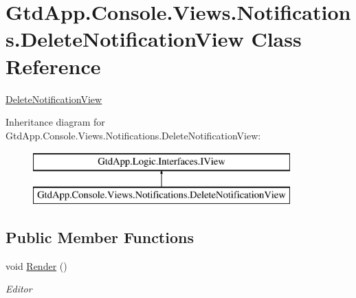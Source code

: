 \hypertarget{class_gtd_app_1_1_console_1_1_views_1_1_notifications_1_1_delete_notification_view}{}\section{Gtd\+App.\+Console.\+Views.\+Notifications.\+Delete\+Notification\+View Class Reference}
\label{class_gtd_app_1_1_console_1_1_views_1_1_notifications_1_1_delete_notification_view}


\mbox{\hyperlink{class_gtd_app_1_1_console_1_1_views_1_1_notifications_1_1_delete_notification_view}{Delete\+Notification\+View}}  


Inheritance diagram for Gtd\+App.\+Console.\+Views.\+Notifications.\+Delete\+Notification\+View\+:\begin{figure}[H]
\begin{center}
\leavevmode
\includegraphics[height=2.000000cm]{class_gtd_app_1_1_console_1_1_views_1_1_notifications_1_1_delete_notification_view}
\end{center}
\end{figure}
\subsection*{Public Member Functions}
\begin{DoxyCompactItemize}
\item 
void \mbox{\hyperlink{class_gtd_app_1_1_console_1_1_views_1_1_notifications_1_1_delete_notification_view_a8398329794538274a3761116a35c9d9f}{Render}} ()
\begin{DoxyCompactList}\small\item\em Editor \end{DoxyCompactList}\end{DoxyCompactItemize}

